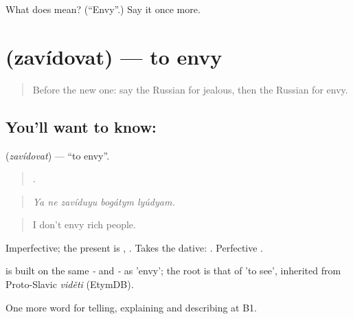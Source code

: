 \begin{tcolorbox}[breakable,colback=teal!4,colframe=teal!35!black,title={Before you move on}]
What does  mean? (\textquotedblleft{}Envy\textquotedblright{}.) Say it once more.
\end{tcolorbox}
\section[\texorpdfstring{\ru{завидовать} (zavídovat)}{завидовать (zavídovat)}]{ (zavídovat) — to envy}

\label{lesson:RU-C469-zavidovat}



\begin{quote}
Before the new one: say the Russian for jealous, then the Russian for envy.
\end{quote}

\subsection*{You'll want to know: }
\textbf{} (\emph{zavídovat}) — \textquotedblleft{}to envy\textquotedblright{}.

\begin{quote}
    .
\end{quote}

\begin{quote}
\emph{Ya ne zavíduyu bogátym lyúdyam.}
\end{quote}

\begin{quote}
I don't envy rich people.
\end{quote}

Imperfective; the present is , . Takes the dative: \emph{ }. Perfective .

\begin{cousinweb}
\emph{} is built on the same \emph{-} and \emph{-} as \emph{} 'envy'; the root is that of \emph{} 'to see', inherited from Proto-Slavic \emph{viděti} (EtymDB).
\end{cousinweb}

\begin{grammarlens}[title={What you've built}]
One more word for telling, explaining and describing at B1.
\end{grammarlens}

